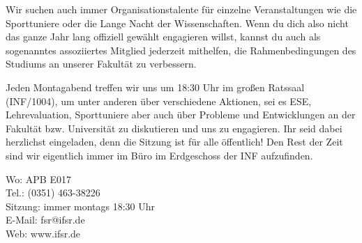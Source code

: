 Wir suchen auch immer Organisationstalente für einzelne Veranstaltungen wie die Sporttuniere oder die Lange Nacht der Wissenschaften.
Wenn du dich also nicht das ganze Jahr lang offiziell gewählt engagieren willst, kannst du auch als sogenanntes assoziiertes Mitglied jederzeit mithelfen, die Rahmenbedingungen des Studiums an unserer Fakultät zu verbessern.

Jeden Montagabend treffen wir uns um 18:30 Uhr im großen Ratssaal (INF/1004), um unter anderen über verschiedene Aktionen, sei es ESE, Lehrevaluation, Sporttuniere aber auch über Probleme und Entwicklungen an der Fakultät bzw. Universität zu diskutieren und uns zu engagieren.
Ihr seid dabei herzlichst eingeladen, denn die Sitzung ist für alle öffentlich!
Den Rest der Zeit sind wir eigentlich immer im Büro im Erdgeschoss der INF aufzufinden.

Wo: APB E017 \\
Tel.: (0351) 463-38226 \\
Sitzung: immer montags 18:30 Uhr \\
E-Mail: fsr@ifsr.de \\
Web: www.ifsr.de


